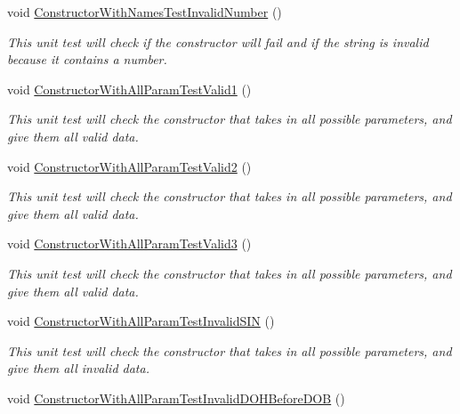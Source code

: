 \begin{DoxyCompactItemize}
void \hyperlink{class_my_all_employee_1_1_tests_1_1_parttime_employee_tests_afa5c9343c7245a45c6c39bc8c821d982}{Constructor\+With\+Names\+Test\+Invalid\+Number} ()
\begin{DoxyCompactList}\small\item\em This unit test will check if the constructor will fail and if the string is invalid because it contains a number. \end{DoxyCompactList}\item 
void \hyperlink{class_my_all_employee_1_1_tests_1_1_parttime_employee_tests_a0cbca99d6bc8eb60f9c2faa98f5441b9}{Constructor\+With\+All\+Param\+Test\+Valid1} ()
\begin{DoxyCompactList}\small\item\em This unit test will check the constructor that takes in all possible parameters, and give them all valid data. \end{DoxyCompactList}\item 
void \hyperlink{class_my_all_employee_1_1_tests_1_1_parttime_employee_tests_afc4d0c29429c2d4238d61c08c3fb2d3c}{Constructor\+With\+All\+Param\+Test\+Valid2} ()
\begin{DoxyCompactList}\small\item\em This unit test will check the constructor that takes in all possible parameters, and give them all valid data. \end{DoxyCompactList}\item 
void \hyperlink{class_my_all_employee_1_1_tests_1_1_parttime_employee_tests_a3ce1978ff98c7f208eaf239195bfab88}{Constructor\+With\+All\+Param\+Test\+Valid3} ()
\begin{DoxyCompactList}\small\item\em This unit test will check the constructor that takes in all possible parameters, and give them all valid data. \end{DoxyCompactList}\item 
void \hyperlink{class_my_all_employee_1_1_tests_1_1_parttime_employee_tests_a72a8ea8c0c900a8e045dabd5617ba707}{Constructor\+With\+All\+Param\+Test\+Invalid\+S\+I\+N} ()
\begin{DoxyCompactList}\small\item\em This unit test will check the constructor that takes in all possible parameters, and give them all invalid data. \end{DoxyCompactList}\item 
void \hyperlink{class_my_all_employee_1_1_tests_1_1_parttime_employee_tests_ae59654accc19b9d7e38ab7f4e0f34fb6}{Constructor\+With\+All\+Param\+Test\+Invalid\+D\+O\+H\+Before\+D\+O\+B} ()

\end{DoxyCompactItemize}
